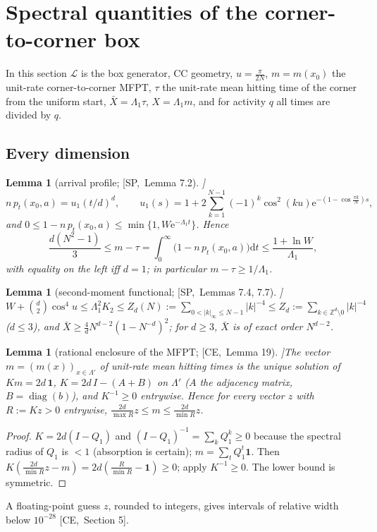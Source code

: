 \documentclass[10pt,a4paper]{article}
\theoremstyle{plain}
\newtheorem{lemma}[theorem]{Lemma}
\theoremstyle{definition}
\newcommand{\src}[2]{[\textsf{#1},~#2]}           %
\newcommand{\SPE}{\textsf{SP}}
\newcommand{\CER}{\textsf{CE}}
\newcommand{\Z}{\mathbb{Z}}
\newcommand{\Lg}{\mathcal{L}}
\newcommand{\ee}{\mathrm{e}}
\newcommand{\dd}{\mathrm{d}}
\newcommand{\Xb}{\bar X}
\begin{document}
\section{Spectral quantities of the corner-to-corner box}\label{sec:spectral}

In this section $\Lg$ is the box generator, CC geometry, $u=\frac\pi{2N}$, $m=m(x_0)$ the unit-rate corner-to-corner MFPT, $\tau$ the unit-rate mean hitting time of the corner from the uniform start, $\Xb=\Lambda_1\tau$, $X=\Lambda_1m$, and for activity $q$ all times are divided by $q$.

\subsection{Every dimension}

\begin{lemma}[arrival profile; \src{\SPE}{Lemma 7.2}]\label{lem:arrival}
\[n\,p_t(x_0,a)=u_1(t/d)^d,\qquad u_1(s)=1+2\sum_{k=1}^{N-1}(-1)^k\cos^2(ku)\ee^{-(1-\cos\frac{\pi k}N)s},\]
and $0\le1-n\,p_t(x_0,a)\le\min\{1,W\ee^{-\Lambda_1t}\}$.
Hence
\[
\frac{d(N^2-1)}3\le m-\tau=\int_0^\infty\bigl(1-n\,p_t(x_0,a)\bigr)\dd t\le\frac{1+\ln W}{\Lambda_1},
\]
with equality on the left iff $d=1$; in particular $m-\tau\ge1/\Lambda_1$.
\end{lemma}

\begin{lemma}[second-moment functional; \src{\SPE}{Lemmas 7.4, 7.7}]\label{lem:K2}
$W+\binom d2\cos^4u\le\Lambda_1^2K_2\le Z_d(N):=\sum_{0<|k|_\infty\le N-1}|k|^{-4}\le Z_d:=\sum_{k\in\Z^d\setminus0}|k|^{-4}$ ($d\le3$), and $\Xb\ge\frac4dN^{d-2}(1-N^{-d})^2$; for $d\ge3$, $\Xb$ is of exact order $N^{d-2}$.
\end{lemma}

\begin{lemma}[rational enclosure of the MFPT; \src{\CER}{Lemma 19}]\label{lem:mfpt-encl}
The vector $m=(m(x))_{x\in\Lambda'}$ of unit-rate mean hitting times is the unique solution of $Km=2d\,\mathbf1$, $K=2d\,I-(A+B)$ on $\Lambda'$ ($A$ the adjacency matrix, $B=\operatorname{diag}(b)$), and $K^{-1}\ge0$ entrywise. Hence for every vector $z$ with $R:=Kz>0$ entrywise, $\frac{2d}{\max R}z\le m\le\frac{2d}{\min R}z$.
\end{lemma}
\begin{proof}
$K=2d(I-Q_1)$ and $(I-Q_1)^{-1}=\sum_kQ_1^k\ge0$ because the spectral radius of $Q_1$ is $<1$ (absorption is certain); $m=\sum_tQ_1^t\mathbf1$. Then $K(\frac{2d}{\min R}z-m)=2d(\frac R{\min R}-\mathbf1)\ge0$; apply $K^{-1}\ge0$. The lower bound is symmetric.
\end{proof}
A floating-point guess $z$, rounded to integers, gives intervals of relative width below $10^{-28}$ \src{\CER}{Section 5}.
\end{document}
